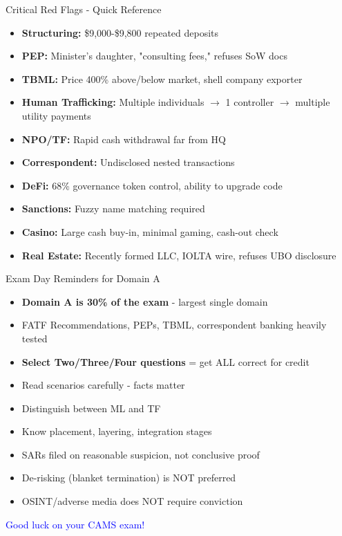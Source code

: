 \documentclass{beamer}
\begin{document}
										\begin{frame}{Critical Red Flags - Quick Reference}
											\begin{itemize}
												\item \textbf{Structuring:} \$9,000-\$9,800 repeated deposits
												\item \textbf{PEP:} Minister's daughter, "consulting fees," refuses SoW docs
												\item \textbf{TBML:} Price 400\% above/below market, shell company exporter
												\item \textbf{Human Trafficking:} Multiple individuals $\rightarrow$ 1 controller $\rightarrow$ multiple utility payments
												\item \textbf{NPO/TF:} Rapid cash withdrawal far from HQ
												\item \textbf{Correspondent:} Undisclosed nested transactions
												\item \textbf{DeFi:} 68\% governance token control, ability to upgrade code
												\item \textbf{Sanctions:} Fuzzy name matching required
												\item \textbf{Casino:} Large cash buy-in, minimal gaming, cash-out check
												\item \textbf{Real Estate:} Recently formed LLC, IOLTA wire, refuses UBO disclosure
											\end{itemize}
										\end{frame}
										
										\begin{frame}{Exam Day Reminders for Domain A}
											\begin{itemize}
												\item \textbf{Domain A is 30\% of the exam} - largest single domain
												\item FATF Recommendations, PEPs, TBML, correspondent banking heavily tested
												\item \textbf{Select Two/Three/Four questions} = get ALL correct for credit
												\item Read scenarios carefully - facts matter
												\item Distinguish between ML and TF
												\item Know placement, layering, integration stages
												\item SARs filed on reasonable suspicion, not conclusive proof
												\item De-risking (blanket termination) is NOT preferred
												\item OSINT/adverse media does NOT require conviction
											\end{itemize}
											\vspace{0.5cm}
											\centering
											\textcolor{blue}{\Large Good luck on your CAMS exam!}
										\end{frame}
										
									
\end{document}
